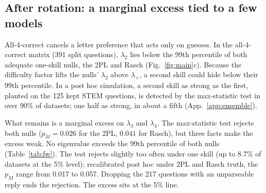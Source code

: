 \documentclass{article}
\theoremstyle{plain}
\theoremstyle{remark}
\begin{document}
\subsection{After rotation: a marginal excess tied to a few models}
\label{sec:all4}

All-4-correct cancels a letter preference that acts only on guesses. In
the all-4-correct matrix (391 split questions), $\lambda_2$ lies below the 99th percentile of both
adequate one-skill nulls, the 2PL and Rasch (Fig.~\ref{fig:main}c). Because the
difficulty factor lifts the nulls' $\lambda_2$ above $\lambda_+$, a
second skill could hide below their 99th percentile. In a post hoc simulation, a second skill as
strong as the first, planted on the 125 kept STEM questions, is
detected by the max-statistic test in over 90\% of datasets; one half as strong, in about a fifth (App.~\ref{app:ensemble}).

What remains is a marginal excess on $\lambda_3$ and $\lambda_4$. The
max-statistic test rejects both nulls ($p_M=0.026$ for the 2PL, $0.041$
for Rasch), but three facts make the excess weak. No eigenvalue exceeds
the 99th percentile of both nulls (Table~\ref{tab:fw}). The test rejects
slightly too often under one skill (up to 8.7\% of datasets at the 5\%
level); recalibrated post hoc under 2PL and Rasch truth, the $p_M$ range
from 0.017 to 0.057. Dropping the 217 questions with an unparseable reply
ends the rejection. The excess sits at the
5\% line.
\end{document}
